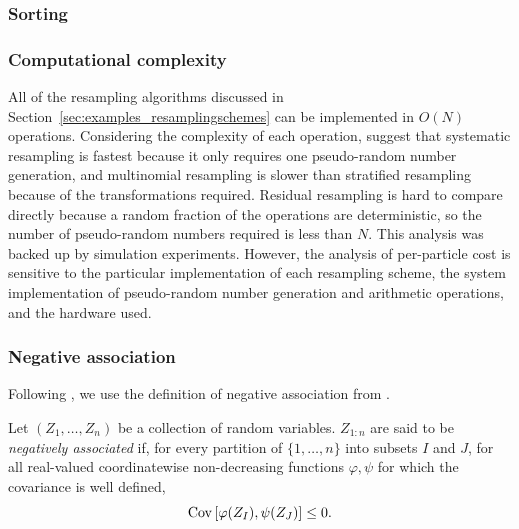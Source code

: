 \subsubsection{Sorting}



\subsubsection{Computational complexity \seb{$\checkmark$} }
All of the resampling algorithms discussed in Section~\ref{sec:examples_resamplingschemes} can be implemented in $O(N)$ operations.
Considering the complexity of each operation, \textcite{hol2004,hol2006} suggest that systematic resampling is fastest because it only requires one pseudo-random number generation, and multinomial resampling is slower than stratified resampling because of the transformations required. Residual resampling is hard to compare directly because a random fraction of the operations are deterministic, so the number of pseudo-random numbers required is less than $N$.
This analysis was backed up by simulation experiments.
However, the analysis of per-particle cost is sensitive to the particular implementation of each resampling scheme, the system implementation of pseudo-random number generation and arithmetic operations, and the hardware used.




\subsubsection{Negative association}

Following \textcite{gerber2017}, we use the definition of negative association from \textcite{joag1983}.
\begin{defn}
Let $(Z_1, \dots, Z_n)$ be a collection of random variables. 
$Z_{1:n}$ are said to be \emph{negatively associated} if, for every partition of $\{1,\dots, n\}$ into subsets $I$ and $J$, for all real-valued coordinatewise non-decreasing functions $\varphi, \psi$ for which the covariance is well defined,
\begin{equation}
\operatorname{Cov} \left[ \varphi( Z_I) , \psi(Z_J) \right] \leq 0 .
\end{equation}
\end{defn}



